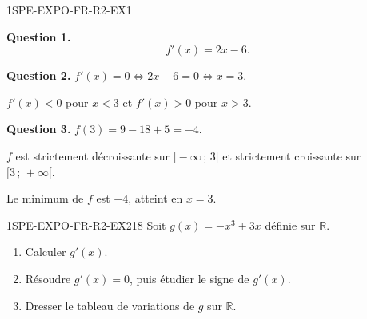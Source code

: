 
\begin{corrige}{1SPE-EXPO-FR-R2-EX1}

\textbf{Question 1.}
\[
f'(x) = 2x - 6.
\]

\textbf{Question 2.} $f'(x) = 0 \Leftrightarrow 2x - 6 = 0 \Leftrightarrow x = 3$.

$f'(x) < 0$ pour $x < 3$ et $f'(x) > 0$ pour $x > 3$.


\textbf{Question 3.} $f(3) = 9 - 18 + 5 = -4$.

$f$ est strictement décroissante sur $]-\infty\,;\,3]$ et strictement croissante sur $[3\,;\,+\infty[$.

Le minimum de $f$ est $-4$, atteint en $x = 3$.

\end{corrige}


\begin{exercice}{1SPE-EXPO-FR-R2-EX2}{1}{8}
Soit $g(x) = -x^3 + 3x$ définie sur $\mathbb{R}$.
\begin{enumerate}
  \item Calculer $g'(x)$.
  \item Résoudre $g'(x) = 0$, puis étudier le signe de $g'(x)$.
  \item Dresser le tableau de variations de $g$ sur $\mathbb{R}$.
\end{enumerate}
\end{exercice}




